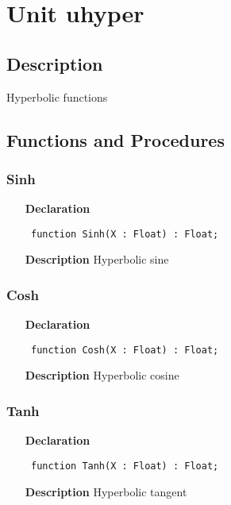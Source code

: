 \documentclass[12pt,a4paper,oneside]{report}
\newcommand{\declarationitem}[1]{\textbf{#1}}
\newcommand{\descriptiontitle}[1]{\textbf{#1}}
\newcommand{\code}[1]{\texttt{#1}}
\begin{document}
\section{Unit uhyper}
\label{uhyper}
\subsection{Description}
Hyperbolic functions 
\subsection{Functions and Procedures}
\subsubsection{Sinh}
\label{uhyper-Sinh}
\begin{itemize}\item[\declarationitem{Declaration}\hfill]
	\begin{flushleft}
		\code{
			function Sinh(X : Float) : Float;}
		
	\end{flushleft}
	
	\par
	\item[\descriptiontitle{Description}]
	Hyperbolic sine
	
\end{itemize}
\subsubsection{Cosh}
\label{uhyper-Cosh}
\begin{itemize}\item[\declarationitem{Declaration}\hfill]
	\begin{flushleft}
		\code{
			function Cosh(X : Float) : Float;}
		
	\end{flushleft}
	
	\par
	\item[\descriptiontitle{Description}]
	Hyperbolic cosine
	
\end{itemize}
\subsubsection{Tanh}
\label{uhyper-Tanh}
\begin{itemize}\item[\declarationitem{Declaration}\hfill]
	\begin{flushleft}
		\code{
			function Tanh(X : Float) : Float;}
		
	\end{flushleft}
	
	\par
	\item[\descriptiontitle{Description}]
	Hyperbolic tangent
	
\end{itemize}
\end{document}
